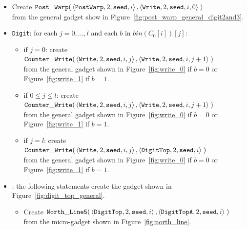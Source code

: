 \begin{itemize}
    \item Create
    $\begin{aligned}[t]
        {\tt Post\_Warp}(&\left\langle {\tt PostWarp}, 2, {\tt seed}, i    \right\rangle,
                   \left\langle {\tt Write},    2, {\tt seed}, i, 0 \right\rangle \;)
    \end{aligned}$\\ from the general gadget show in Figure~\ref{fig:post_warp_general_digit2and3}.

    \item {\tt Digit}: for each $j=0,\ldots,l$ and each $b$ in $bin(C_0[i])[j]$:
    \begin{itemize}
        \item if $j = 0$: create
        $\begin{aligned}[t]
            {\tt Counter\_Write}(&\left\langle {\tt Write}, 2, {\tt seed}, i, j \right\rangle, \left\langle {\tt Write}, 2, {\tt seed}, i, j + 1  \right\rangle \;)
        \end{aligned}$\\from the general gadget shown in Figure~\ref{fig:write_0} if $b = 0$ or Figure~\ref{fig:write_1} if $b = 1$.

        \item if $0 \leqslant j \leqslant l$: create
        $\begin{aligned}[t]
            {\tt Counter\_Write}(&\left\langle {\tt Write}, 2, {\tt seed}, i, j \right\rangle, \left\langle {\tt Write}, 2, {\tt seed}, i, j + 1 \right\rangle \;)
        \end{aligned}$\\from the general gadget shown in Figure~\ref{fig:write_0} if $b = 0$ or Figure~\ref{fig:write_1} if $b = 1$.

        \item if $j = l$: create
        $\begin{aligned}[t]
            {\tt Counter\_Write}(&\left\langle {\tt Write}, 2, {\tt seed}, i, j \right\rangle, \left\langle {\tt DigitTop}, 2, {\tt seed}, i \right\rangle \;)
        \end{aligned}$\\from the general gadget shown in Figure~\ref{fig:write_0} if $b = 0$ or Figure~\ref{fig:write_1} if $b = 1$.
    \end{itemize}


    \item {\dtop}: the following statements create the gadget shown in Figure~\ref{fig:digit_top_general}.
    \begin{itemize}
        \item Create
        $\begin{aligned}[t]
            {\tt North\_Line5}(& \left \langle {\tt DigitTop},  2, {\tt seed} , i \right\rangle,
                                 \left \langle {\tt DigitTopA}, 2, {\tt seed} , i \right\rangle \;)
        \end{aligned}$\\ from the micro-gadget shown in Figure~\ref{fig:north_line}.


\end{itemize}
\end{itemize}
